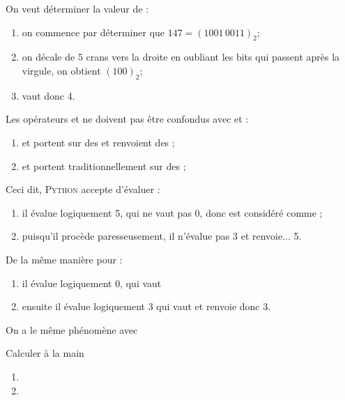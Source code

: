 \documentclass[a4paper,12pt,french]{book}
\begin{document}
\begin{exemple}[]
	On veut déterminer la valeur de  :
	\begin{enumerate}[--]
		\item 	on commence par déterminer que $147=(1001\,0011)_2$;
		\item 	on décale de 5 crans vers la droite en oubliant les bits qui passent après la virgule, on obtient $(100)_2$;
		\item 	{} vaut donc 4.
	\end{enumerate}
\end{exemple}

\begin{attention}
	Les opérateurs \tw{\&} et \tw{|} ne doivent pas être confondus avec  et  :
	\begin{enumerate}[--]
		\item 	\tw{\&} et \tw{|} portent sur des  et renvoient des ;
		\item 	{} et  portent traditionnellement sur des ;
	\end{enumerate}
	Ceci dit, \textsc{Python} accepte d'évaluer  :
	\begin{enumerate}[--]
		\item 	il évalue logiquement 5, qui ne vaut pas 0, donc est considéré comme ;
		\item 	puisqu'il procède paresseusement, il n'évalue pas 3 et renvoie... 5.
	\end{enumerate}

	De la même manière pour  :
	\begin{enumerate}[--]
		\item 	il évalue logiquement 0, qui vaut 
		\item 	ensuite il évalue logiquement 3 qui vaut  et renvoie donc 3.
	\end{enumerate}

	On a le même phénomène avec 

\end{attention}

\begin{exercice}[]
	Calculer à la main
	\begin{enumerate}[\bfseries 1.]
		\item 	{}
		\item 	{}
	\end{enumerate}
\end{exercice}
\end{document}
